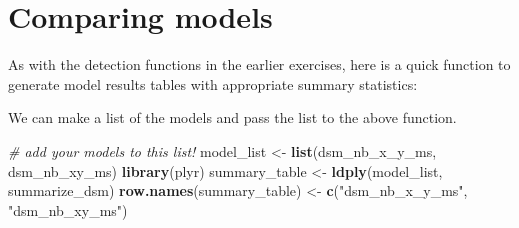 \documentclass[]{book}
\newenvironment{Shaded}{\begin{snugshade}}{\end{snugshade}}
\newcommand{\KeywordTok}[1]{\textcolor[rgb]{0.13,0.29,0.53}{\textbf{#1}}}
\newcommand{\DataTypeTok}[1]{\textcolor[rgb]{0.13,0.29,0.53}{#1}}
\newcommand{\DecValTok}[1]{\textcolor[rgb]{0.00,0.00,0.81}{#1}}
\newcommand{\StringTok}[1]{\textcolor[rgb]{0.31,0.60,0.02}{#1}}
\newcommand{\CommentTok}[1]{\textcolor[rgb]{0.56,0.35,0.01}{\textit{#1}}}
\newcommand{\ControlFlowTok}[1]{\textcolor[rgb]{0.13,0.29,0.53}{\textbf{#1}}}
\newcommand{\OperatorTok}[1]{\textcolor[rgb]{0.81,0.36,0.00}{\textbf{#1}}}
\newcommand{\NormalTok}[1]{#1}
\theoremstyle{definition}
\theoremstyle{definition}
\theoremstyle{remark}
\begin{document}
\section{Comparing models}\label{comparing-models}

As with the detection functions in the earlier exercises, here is a
quick function to generate model results tables with appropriate summary
statistics:

\begin{Shaded}
\end{Shaded}

We can make a list of the models and pass the list to the above
function.

\begin{Shaded}
\begin{Highlighting}[]
\CommentTok{# add your models to this list!}
\NormalTok{model_list <-}\StringTok{ }\KeywordTok{list}\NormalTok{(dsm_nb_x_y_ms, dsm_nb_xy_ms)}
\KeywordTok{library}\NormalTok{(plyr)}
\NormalTok{summary_table <-}\StringTok{ }\KeywordTok{ldply}\NormalTok{(model_list, summarize_dsm)}
\KeywordTok{row.names}\NormalTok{(summary_table) <-}\StringTok{ }\KeywordTok{c}\NormalTok{(}\StringTok{"dsm_nb_x_y_ms"}\NormalTok{, }\StringTok{"dsm_nb_xy_ms"}\NormalTok{)}
\end{Highlighting}
\end{Shaded}
\end{document}
